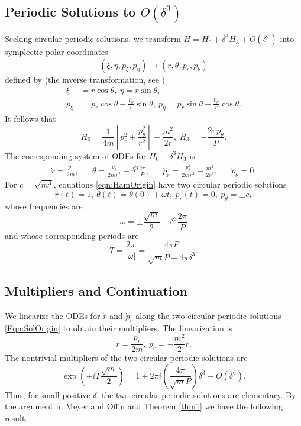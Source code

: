 \documentclass[12pt]{article}
\begin{document}
\subsection{Periodic Solutions to $O(\delta^3)$}
Seeking circular periodic solutions, we transform $H = H_0 + \delta^3 H_3 + O(\delta^7)$ into symplectic polar coordinates
\[ (\xi,\eta,p_\xi,p_\eta) \to (r,\theta,p_r,p_\theta)\]
defined by (the inverse transformation, see \cite{meyerOffin})
\begin{align*}
\xi & = r\cos\theta,\ \eta = r\sin\theta, \\
p_\xi & = p_r \cos\theta - \frac{p_\theta}{r}\sin\theta,\ p_\eta  = p_r\sin\theta + \frac{p_\theta}{r}\cos\theta.
\end{align*}
It follows that
\[ H_0  = \frac{1}{4m}\left[ p_r^2 + \frac{p_\theta^2}{r^2}\right] - \frac{m^2}{2r},\ 
H_3 = - \frac{2\pi p_\theta}{P}.\]
The corresponding system of ODEs for $H_0 + \delta^3 H_3$ is
\begin{align} \label{eqn:HamOrigin}
\dot r  = \frac{p_r}{2m}, & & 
\dot \theta  = \frac{p_\theta}{2mr^2} - \delta^3 \frac{2\pi}{P}, & &
\dot p_r = \frac{p_\theta^2}{2mr^3} - \frac{m^2}{2r^2}, & &
\dot p_\theta  = 0.
\end{align}
For $c = \sqrt{m^3}$, equations \eqref{eqn:HamOrigin} have two circular periodic solutions
\begin{equation}\label{Eqn:SolOrigin}
r(t) = 1,\ \theta(t) = \theta(0) + \omega t,\ p_r(t) = 0,\ p_\theta = \pm c,
\end{equation}
whose frequencies are
\[ \omega = \pm \frac{\sqrt{m}}{2} - \delta^3 \frac{2\pi}{P} \]
and whose corresponding periods are
\[ T = \frac{2\pi}{\vert \omega\vert} = \frac{4\pi P}{\sqrt{m}P \mp 4\pi \delta^3}.\]

\subsection{Multipliers and Continuation}
We linearize the ODEs for $\dot r$ and $\dot p_r$ along the two circular periodic solutions \eqref{Eqn:SolOrigin} to obtain their multipliers.
The linearization is
\[ \dot r  = \frac{p_r}{2m}, \ \dot p_r  = -\frac{m^2}2 r.\]
The nontrivial multipliers of the two circular periodic solutions are
\[ \exp\left(\pm  i T \frac{\sqrt{m}}2 \right) = 1 \pm 2\pi i \left( \frac{4\pi}{\sqrt{m}P}\right) \delta^3 + O(\delta^6). \]
Thus, for small positive $\delta$, the two circular periodic solutions are elementary. By the argument in Meyer and Offin \cite{meyerOffin} and Theorem \ref{thm1} we have the following result.
\end{document}
